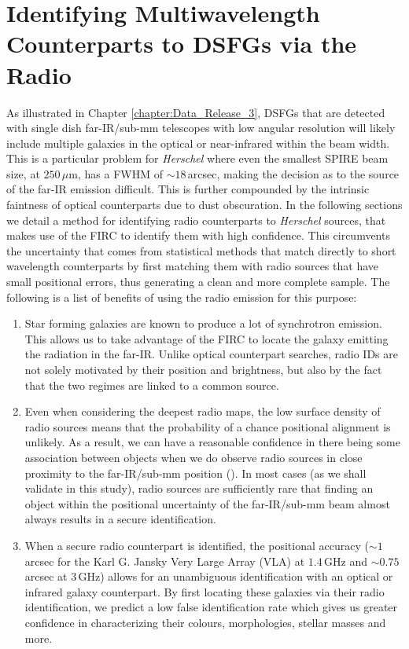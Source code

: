 \section{Identifying Multiwavelength Counterparts to DSFGs via the Radio}

As illustrated in Chapter \ref{chapter:Data_Release_3}, DSFGs that are detected with single dish far-IR/sub-mm telescopes with low angular resolution will likely include multiple galaxies in the optical or near-infrared within the beam width. This is a particular problem for \textit{Herschel} where even the smallest SPIRE beam size, at $250\,\mu$m, has a FWHM of $\sim 18\,$arcsec, making the decision as to the source of the far-IR emission difficult. This is further compounded by the intrinsic faintness of optical counterparts due to dust obscuration. In the following sections we detail a method for identifying radio counterparts to \textit{Herschel} sources, that makes use of the FIRC to identify them with high confidence. This circumvents the uncertainty that comes from statistical methods that match directly to short wavelength counterparts by first matching them with radio sources that have small positional errors, thus generating a clean and more complete sample. The following is a list of benefits of using the radio emission for this purpose:

\begin{enumerate}
    \item Star forming galaxies are known to produce a lot of synchrotron emission. This allows us to take advantage of the FIRC to locate the galaxy emitting the radiation in the far-IR. Unlike optical counterpart searches, radio IDs are not solely motivated by their position and brightness, but also by the fact that the two regimes are linked to a common source.
    \item Even when considering the deepest radio maps, the low surface density of radio sources means that the probability of a chance positional alignment is unlikely. As a result, we can have a reasonable confidence in there being some association between objects when we do observe radio sources in close proximity to the far-IR/sub-mm position (\citealt{Ivison_2002, Borys_2004}). In most cases (as we shall validate in this study), radio sources are sufficiently rare that finding an object within the positional uncertainty of the far-IR/sub-mm beam almost always results in a secure identification.
    \item When a secure radio counterpart is identified, the positional accuracy ($\sim 1\,$arcsec for the Karl G. Jansky Very Large Array (VLA) at $1.4\,$GHz and $\sim 0.75\,$arcsec at $3\,$GHz) allows for an unambiguous identification with an optical or infrared galaxy counterpart. By first locating these galaxies via their radio identification, we predict a low false identification rate which gives us greater confidence in characterizing their colours, morphologies, stellar masses and more.
\end{enumerate}

